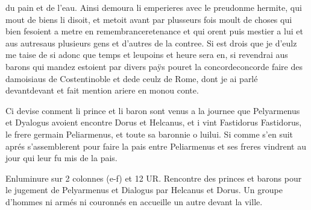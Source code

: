 \documentclass{article}
\begin{document}
\begin{pages}
   du pain et de l'eau.
   Ainsi demoura li emperieres avec
   le preudonme 
      hermite, 
   qui mout de biens li disoit, et metoit avant par plusseurs fois 
   moult de choses qui bien fesoient a metre en 
   remembranceretenance 
   et qui orent puis mestier a lui et aus autresaus plusieurs gens et d'autres 
   de la contree. 
   Si est drois que je d’eulz me taise de si adonc que 
      temps et leupoins 
         et heure sera
      en, 
      si revendrai aus barons qui mandez estoient par divers paÿs pouret 
      la concordeconcorde faire des damoisiaus de 
      Costentinoble et 
      dede ceulz de Rome, 
      dont je ai parlé devantdevant et fait mention ariere 
      en monou conte.
 \pend
         
            Ci devise conment 
               li prince et li baron sont venus 
               a la journee que Pelyarmenus et 
               Dyalogus avoient encontre 
               Dorus et Helcanus, et i vint 
                  Fastidorus
                     Fastidorus, le frere germain Peliarmenus, 
                  et toute sa baronnie o luilui. Si comme s'en suit aprés
                  s'assemblerent pour faire la pais entre Peliarmenus et ses freres
                  vindrent au jour qui leur fu mis de la pais.
            
               Enluminure sur 2 colonnes (e-f) et 12 UR. Rencontre des princes et barons pour 
                  le jugement de Pelyarmenus et 
                  Dialogus par 
                  Helcanus et Dorus. 
                  Un groupe d’hommes ni armés ni couronnés en accueille un autre devant la ville. 
               

\end{pages}
\end{document}
